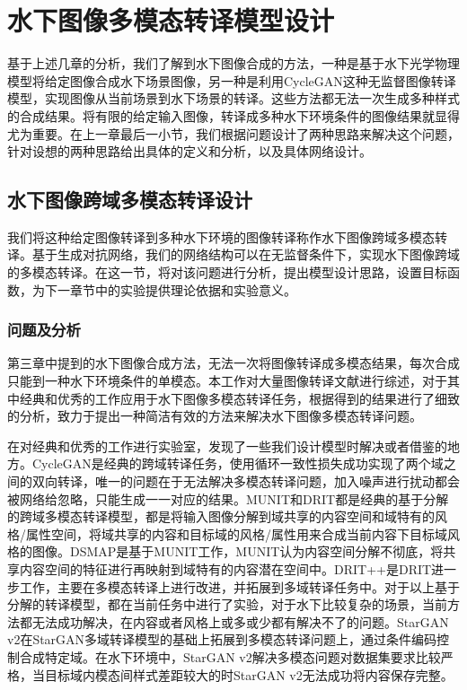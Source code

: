 \chapter{水下图像多模态转译模型设计}
基于上述几章的分析，我们了解到水下图像合成的方法，一种是基于水下光学物理模型将给定图像合成水下场景图像，另一种是利用CycleGAN这种无监督图像转译模型，实现图像从当前场景到水下场景的转译。这些方法都无法一次生成多种样式的合成结果。将有限的给定输入图像，转译成多种水下环境条件的图像结果就显得尤为重要。在上一章最后一小节，我们根据问题设计了两种思路来解决这个问题，针对设想的两种思路给出具体的定义和分析，以及具体网络设计。

\section{水下图像跨域多模态转译设计}
我们将这种给定图像转译到多种水下环境的图像转译称作水下图像跨域多模态转译。基于生成对抗网络，我们的网络结构可以在无监督条件下，实现水下图像跨域的多模态转译。在这一节，将对该问题进行分析，提出模型设计思路，设置目标函数，为下一章节中的实验提供理论依据和实验意义。

\subsection{问题及分析}
第三章中提到的水下图像合成方法，无法一次将图像转译成多模态结果，每次合成只能到一种水下环境条件的单模态。本工作对大量图像转译文献进行综述，对于其中经典和优秀的工作应用于水下图像多模态转译任务，根据得到的结果进行了细致的分析，致力于提出一种简洁有效的方法来解决水下图像多模态转译问题。

在对经典和优秀的工作进行实验室，发现了一些我们设计模型时解决或者借鉴的地方。CycleGAN是经典的跨域转译任务，使用循环一致性损失成功实现了两个域之间的双向转译，唯一的问题在于无法解决多模态转译问题，加入噪声进行扰动都会被网络给忽略，只能生成一一对应的结果。MUNIT和DRIT都是经典的基于分解的跨域多模态转译模型，都是将输入图像分解到域共享的内容空间和域特有的风格/属性空间，将域共享的内容和目标域的风格/属性用来合成当前内容下目标域风格的图像。DSMAP是基于MUNIT工作，MUNIT认为内容空间分解不彻底，将共享内容空间的特征进行再映射到域特有的内容潜在空间中。DRIT++是DRIT进一步工作，主要在多模态转译上进行改进，并拓展到多域转译任务中。对于以上基于分解的转译模型，都在当前任务中进行了实验，对于水下比较复杂的场景，当前方法都无法成功解决，在内容或者风格上或多或少都有解决不了的问题。StarGAN v2在StarGAN多域转译模型的基础上拓展到多模态转译问题上，通过条件编码控制合成特定域。在水下环境中，StarGAN v2解决多模态问题对数据集要求比较严格，当目标域内模态间样式差距较大的时StarGAN v2无法成功将内容保存完整。

